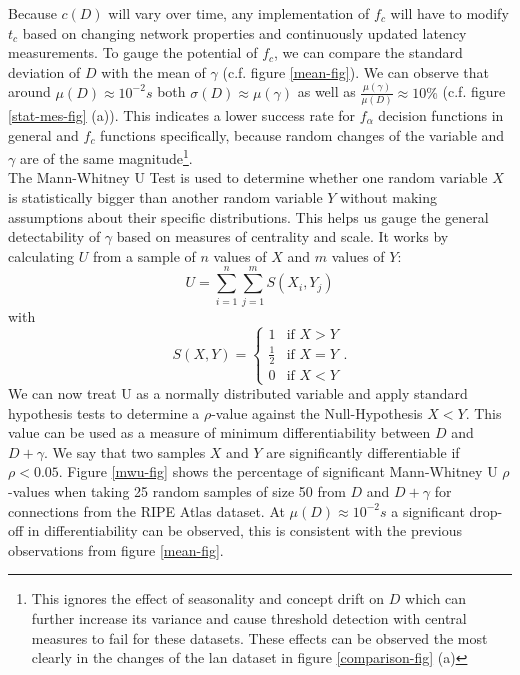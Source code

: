 \documentclass[12pt,a4paper,automark, toc=bib]{scrreprt}
\theoremstyle{definition}
\begin{document}
			Because $c(D)$ will vary over time, any implementation of $f_c$ will have to modify $t_c$ based on changing network properties and continuously updated latency measurements. To gauge the potential of $f_c$, we can compare the standard deviation of $D$ with the mean of $\gamma$ (c.f. figure \ref{mean-fig}). We can observe that around $\mu(D) \approx 10^{-2} s$ both $\sigma(D) \approx \mu(\gamma)$ as well as $\frac{\mu(\gamma)}{\mu(D)} \approx 10\%$ (c.f. figure \ref{stat-mes-fig} (a)). This indicates a lower success rate for $f_\alpha$ decision functions in general and $f_c$ functions specifically, because random changes of the variable and $\gamma$ are of the same magnitude\footnote{This ignores the effect of seasonality and concept drift on $D$ which can further increase its variance and cause threshold detection with central measures to fail for these datasets. These effects can be observed the most clearly in the changes of the lan dataset in figure \ref{comparison-fig} (a)}. \\
			The Mann-Whitney U Test  \cite{Mann1947} is used to determine whether one random variable $X$ is statistically bigger than another random variable $Y$ without making assumptions about their specific distributions. This helps us gauge the general detectability of $\gamma$ based on measures of centrality and scale. It works by calculating $U$ from a sample of $n$ values of $X$ and $m$ values of $Y$: \begin{equation}
				U = \sum_{i=1}^{n}\sum_{j=1}^{m}S(X_i, Y_j)
			\end{equation}
			with 
			\[
			S(X, Y) = \begin{cases}
				1 & \text{if } X>Y\\
				\frac{1}{2} & \text{if } X=Y\\
				0 & \text{if } X<Y
			\end{cases}.
			\]
			We can now treat U as a normally distributed variable and apply standard hypothesis tests to determine a $\rho$-value against the Null-Hypothesis $X<Y$. This value can be used as a measure of minimum differentiability between $D$ and $D+\gamma$. We say that two samples $X$ and $Y$ are significantly differentiable if $\rho<0.05$. Figure \ref{mwu-fig} shows the percentage of significant Mann-Whitney U $\rho$-values when taking 25 random samples of size 50 from $D$  and $D+\gamma$ for connections from the RIPE Atlas dataset. At $\mu(D) \approx 10^{-2} s$ a significant drop-off in  differentiability can be observed, this is consistent with the previous observations from figure \ref{mean-fig}.\\
\end{document}
